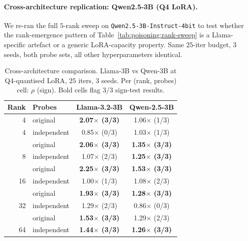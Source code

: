 \documentclass[11pt,a4paper]{article}
\begin{document}
\paragraph{Cross-architecture replication: Qwen2.5-3B (Q4 LoRA).}
We re\nobreakdash-ran the full $5$\nobreakdash-rank sweep on
\texttt{Qwen2.5-3B-Instruct-4bit} to test whether the
rank\nobreakdash-emergence pattern of
Table~\ref{tab:poisoning:rank-sweep} is a Llama-specific
artefact or a generic LoRA\nobreakdash-capacity property.
Same $25$\nobreakdash-iter budget, $3$ seeds, both probe sets,
all other hyperparameters identical.

\begin{table}[h]
\centering
\small
\caption{Cross-architecture comparison.  Llama\nobreakdash-3B
vs Qwen\nobreakdash-3B at Q4\nobreakdash-quantised LoRA,
$25$ iters, $3$ seeds.  Per (rank, probes) cell: $\rho$ (sign).
Bold cells flag $3/3$ sign\nobreakdash-test results.}
\label{tab:poisoning:cross-arch}
\begin{tabular}{r l c c}
\toprule
\textbf{Rank} & \textbf{Probes} & \textbf{Llama-3.2-3B} & \textbf{Qwen-2.5-3B} \\
\midrule
 4 & original    & \textbf{2.07$\times$ (3/3)} & 1.06$\times$ (1/3) \\
 4 & independent & 0.85$\times$ (0/3)          & 1.03$\times$ (1/3) \\
\addlinespace
 8 & original    & \textbf{2.06$\times$ (3/3)} & \textbf{1.35$\times$ (3/3)} \\
 8 & independent & 1.07$\times$ (2/3)          & \textbf{1.25$\times$ (3/3)} \\
\addlinespace
16 & original    & \textbf{2.25$\times$ (3/3)} & \textbf{1.53$\times$ (3/3)} \\
16 & independent & 1.00$\times$ (1/3)          & 1.08$\times$ (2/3) \\
\addlinespace
32 & original    & \textbf{1.93$\times$ (3/3)} & \textbf{1.28$\times$ (3/3)} \\
32 & independent & 1.29$\times$ (2/3)          & 0.86$\times$ (0/3) \\
\addlinespace
64 & original    & \textbf{1.53$\times$ (3/3)} & 1.29$\times$ (2/3) \\
64 & independent & \textbf{1.44$\times$ (3/3)} & \textbf{1.26$\times$ (3/3)} \\
\bottomrule
\end{tabular}
\end{table}
\end{document}
